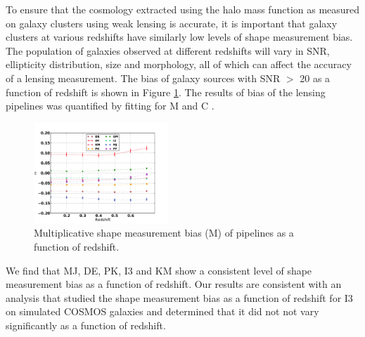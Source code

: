 To ensure that the cosmology extracted using the
halo mass function as measured on galaxy clusters
using weak lensing is accurate, it is important that
galaxy clusters at various redshifts have 
similarly low levels of shape measurement bias. The population of 
galaxies observed at different redshifts will vary in
SNR, ellipticity distribution, size and morphology,
all of which can affect the accuracy of a lensing 
measurement. The bias of galaxy sources with SNR $>$ 
20 as a function of redshift is shown in Figure \ref{fig:red}.
The results of bias of the lensing pipelines was quantified 
by fitting for M and C . 

\begin{figure}
 \centering  %
  \includegraphics[width=0.45\textwidth]{fig/Mvalred_mfix.pdf} 
  \caption{Multiplicative shape measurement
  bias (M) of pipelines as a function of redshift.}
\label{fig:red}
\end{figure}
We find that MJ, DE, PK, I3 and KM
show a consistent level of shape measurement bias as a function of 
redshift. Our results are consistent with an analysis 
that studied the shape measurement bias as a function of redshift for I3 
\citep{K_2} on simulated COSMOS galaxies
and determined that it did not not vary significantly as a function
of redshift. 

